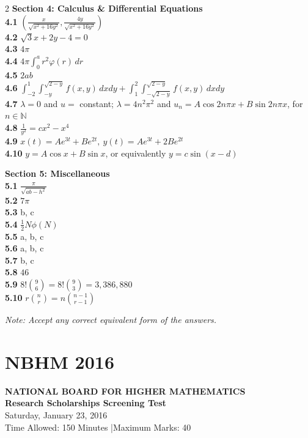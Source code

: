 \documentclass[11pt,a4paper]{article}
\newcommand{\N}{\mathbb{N}}
\newcommand{\examheader}[4]{%
  \clearpage
  \section{#1}
  \begin{center}
    {\large\bfseries NATIONAL BOARD FOR HIGHER MATHEMATICS}\\[3pt]
    {\bfseries #2}\\[2pt]
    {#3}\\[2pt]
    {\small #4}
  \end{center}
  \vspace{4pt}
}
\begin{document}
\begin{multicols}{2}
\medskip
\textbf{Section 4: Calculus \& Differential Equations}\\
\textbf{4.1} $\left(\frac{x}{\sqrt{x^2+16y^2}}, \frac{4y}{\sqrt{x^2+16y^2}}\right)$\\
\textbf{4.2} $\sqrt{3}x + 2y - 4 = 0$\\
\textbf{4.3} $4\pi$\\
\textbf{4.4} $4\pi \int_0^a r^2 \varphi(r)\,dr$\\
\textbf{4.5} $2ab$\\
\textbf{4.6} $\int_{-2}^{1}\int_{-y}^{\sqrt{2-y}} f(x, y)\,dxdy + \int_{1}^{2}\int_{-\sqrt{2-y}}^{\sqrt{2-y}} f(x, y)\,dxdy$\\
\textbf{4.7} $\lambda = 0$ and $u =$ constant; $\lambda = 4n^2\pi^2$ and $u_n = A\cos 2n\pi x + B\sin 2n\pi x$, for $n \in \N$\\
\textbf{4.8} $\frac{1}{y^2} = cx^2 - x^4$\\
\textbf{4.9} $x(t) = Ae^{3t} + Be^{2t},\ y(t) = Ae^{3t} + 2Be^{2t}$\\
\textbf{4.10} $y = A\cos x + B\sin x$, or equivalently $y = c\sin(x - d)$

\medskip
\textbf{Section 5: Miscellaneous}\\
\textbf{5.1} $\frac{\pi}{\sqrt{ab - h^2}}$\\
\textbf{5.2} $7\pi$\\
\textbf{5.3} b, c\\
\textbf{5.4} $\frac{1}{2}N\phi(N)$\\
\textbf{5.5} a, b, c\\
\textbf{5.6} a, b, c\\
\textbf{5.7} b, c\\
\textbf{5.8} $46$\\
\textbf{5.9} $8!\binom{9}{6} = 8!\binom{9}{3} = 3,386,880$\\
\textbf{5.10} $r\binom{n}{r} = n\binom{n-1}{r-1}$

\medskip
\noindent\emph{Note: Accept any correct equivalent form of the answers.}
\end{multicols}
\examheader{NBHM 2016}{Research Scholarships Screening Test}{Saturday, January 23, 2016}{Time Allowed: 150 Minutes \quad|\quad Maximum Marks: 40}
\end{document}
